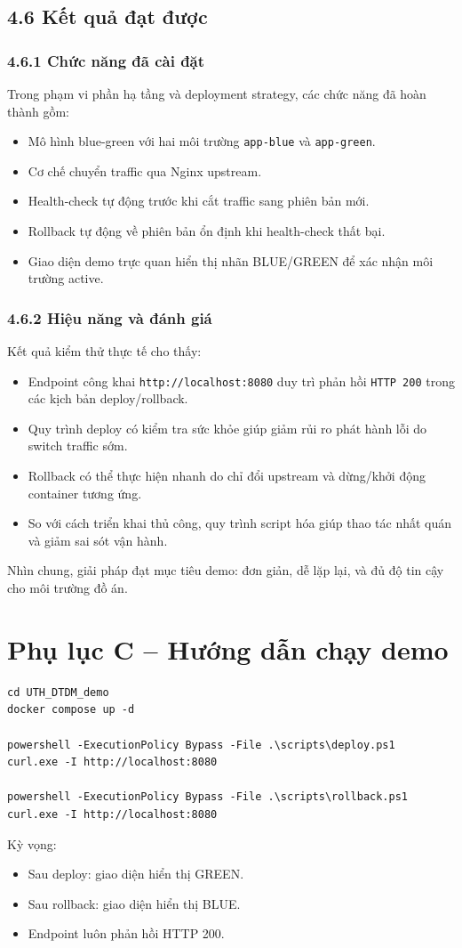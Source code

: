 \subsection*{4.6 Kết quả đạt được}
\subsubsection*{4.6.1 Chức năng đã cài đặt}
Trong phạm vi phần hạ tầng và deployment strategy, các chức năng đã hoàn thành gồm:
\begin{itemize}
  \item Mô hình blue-green với hai môi trường \texttt{app-blue} và \texttt{app-green}.
  \item Cơ chế chuyển traffic qua Nginx upstream.
  \item Health-check tự động trước khi cắt traffic sang phiên bản mới.
  \item Rollback tự động về phiên bản ổn định khi health-check thất bại.
  \item Giao diện demo trực quan hiển thị nhãn BLUE/GREEN để xác nhận môi trường active.
\end{itemize}

\subsubsection*{4.6.2 Hiệu năng và đánh giá}
Kết quả kiểm thử thực tế cho thấy:
\begin{itemize}
  \item Endpoint công khai \texttt{http://localhost:8080} duy trì phản hồi \texttt{HTTP 200} trong các kịch bản deploy/rollback.
  \item Quy trình deploy có kiểm tra sức khỏe giúp giảm rủi ro phát hành lỗi do switch traffic sớm.
  \item Rollback có thể thực hiện nhanh do chỉ đổi upstream và dừng/khởi động container tương ứng.
  \item So với cách triển khai thủ công, quy trình script hóa giúp thao tác nhất quán và giảm sai sót vận hành.
\end{itemize}

Nhìn chung, giải pháp đạt mục tiêu demo: đơn giản, dễ lặp lại, và đủ độ tin cậy cho môi trường đồ án.

\section*{Phụ lục C -- Hướng dẫn chạy demo}
\begin{verbatim}
cd UTH_DTDM_demo
docker compose up -d

powershell -ExecutionPolicy Bypass -File .\scripts\deploy.ps1
curl.exe -I http://localhost:8080

powershell -ExecutionPolicy Bypass -File .\scripts\rollback.ps1
curl.exe -I http://localhost:8080
\end{verbatim}

Kỳ vọng:
\begin{itemize}
  \item Sau deploy: giao diện hiển thị GREEN.
  \item Sau rollback: giao diện hiển thị BLUE.
  \item Endpoint luôn phản hồi HTTP 200.
\end{itemize}

